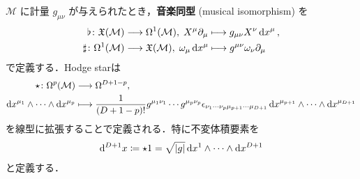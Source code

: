 \documentclass[TQFT_main]{subfiles}
\begin{document}
$\mathcal{M}$ に計量 $g_{\mu\nu}$ が与えられたとき，\textbf{音楽同型} (musical isomorphism) を
\begin{align}
    \flat \colon \mathfrak{X}(\mathcal{M}) &\longrightarrow \Omega^1(\mathcal{M}),\; X^\mu \partial_\mu \longmapsto g_{\mu\nu} X^\nu \dd{x^\mu}, \\
    \sharp \colon \Omega^1(\mathcal{M}) &\longrightarrow \mathfrak{X}(\mathcal{M}),\; \omega_\mu \dd{x^\mu} \longmapsto g^{\mu\nu} \omega_\nu \partial_\mu
\end{align}
で定義する．Hodge starは
\begin{align}
    \star \colon \Omega^p(\mathcal{M}) &\longrightarrow \Omega^{D+1-p},\\ 
    \dd{x^{\mu_1}} \wedge \cdots \wedge \dd{x^{\mu_p}} &\longmapsto \frac{1}{(D+1-p)!} g^{\mu_1 \nu_1} \cdots g^{\mu_p \nu_p} \epsilon_{\nu_1 \cdots \nu_p \mu_{p+1} \cdots \mu_{D+1}} \dd{x}^{\mu_{p+1}} \wedge \cdots \wedge \dd{x}^{\mu_{D+1}}
\end{align}
を線型に拡張することで定義される．特に不変体積要素を
\begin{align}
    \dd[D+1]{x} \coloneqq \star 1 = \sqrt{\abs{g}} \dd{x^1} \wedge \cdots \wedge \dd{x^{D+1}}
\end{align}
と定義する．
\end{document}
